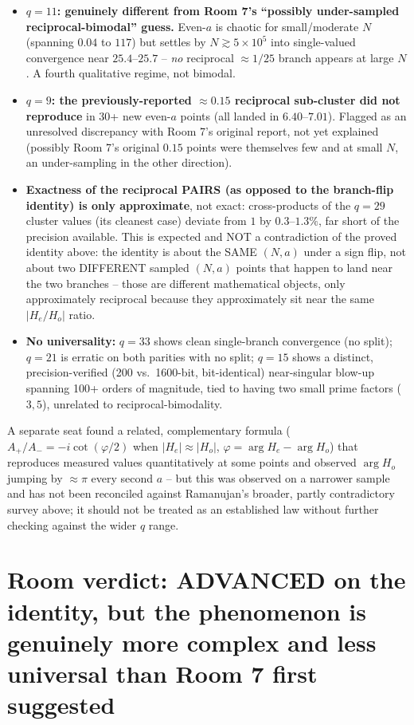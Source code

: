 \documentclass[11pt]{article}
\begin{document}
\begin{itemize}
\item \textbf{$q=11$: genuinely different from Room 7's ``possibly under-sampled reciprocal-bimodal''
guess.} Even-$a$ is chaotic for small/moderate $N$ (spanning $0.04$ to $117$) but settles by
$N\gtrsim5\times10^5$ into single-valued convergence near $25.4$--$25.7$ -- \emph{no} reciprocal
$\approx1/25$ branch appears at large $N$. A fourth qualitative regime, not bimodal.
\item \textbf{$q=9$: the previously-reported $\approx0.15$ reciprocal sub-cluster did not reproduce}
in 30+ new even-$a$ points (all landed in $6.40$--$7.01$). Flagged as an unresolved discrepancy
with Room 7's original report, not yet explained (possibly Room 7's original $0.15$ points were
themselves few and at small $N$, an under-sampling in the other direction).
\item \textbf{Exactness of the reciprocal PAIRS (as opposed to the branch-flip identity) is only
approximate}, not exact: cross-products of the $q=29$ cluster values (its cleanest case) deviate
from $1$ by $0.3$--$1.3\%$, far short of the precision available. This is expected and NOT a
contradiction of the proved identity above: the identity is about the SAME $(N,a)$ under a sign
flip, not about two DIFFERENT sampled $(N,a)$ points that happen to land near the two branches --
those are different mathematical objects, only approximately reciprocal because they approximately
sit near the same $|H_e/H_o|$ ratio.
\item \textbf{No universality:} $q=33$ shows clean single-branch convergence (no split); $q=21$ is
erratic on both parities with no split; $q=15$ shows a distinct, precision-verified (200 vs.\
1600-bit, bit-identical) near-singular blow-up spanning 100+ orders of magnitude, tied to having
two small prime factors ($3,5$), unrelated to reciprocal-bimodality.
\end{itemize}

A separate seat found a related, complementary formula ($A_+/A_-=-i\cot(\varphi/2)$ when
$|H_e|\approx|H_o|$, $\varphi=\arg H_e-\arg H_o$) that reproduces measured values quantitatively at
some points and observed $\arg H_o$ jumping by $\approx\pi$ every second $a$ -- but this was
observed on a narrower sample and has not been reconciled against Ramanujan's broader, partly
contradictory survey above; it should not be treated as an established law without further checking
against the wider $q$ range.

\section*{Room verdict: ADVANCED on the identity, but the phenomenon is genuinely more complex and
less universal than Room 7 first suggested}
\end{document}
